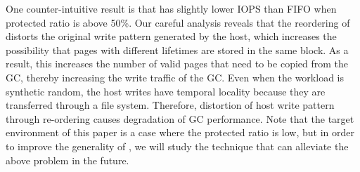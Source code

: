 One counter-intuitive result is that \ours{} has slightly lower IOPS than FIFO when protected ratio is above 50\%. Our careful analysis reveals that the reordering of \ours{} distorts the original write pattern generated by the host, which increases the possibility that pages with different lifetimes are stored in the same block. As a result, this increases the number of valid pages that need to be copied from the GC, thereby increasing the write traffic of the GC. Even when the workload is synthetic random, the host writes have temporal locality because they are transferred through a file system. Therefore, distortion of host write pattern through re-ordering causes degradation of GC performance. Note that the target environment of this paper is a case where the protected ratio is low, but in order to improve the generality of \ours{}, we will study the technique that can alleviate the above problem in the future.





%



